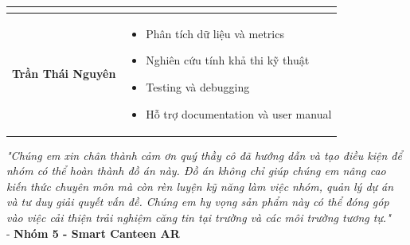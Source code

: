 \documentclass[12pt,a4paper]{article}
\begin{document}
\begin{table}[H]
\begin{tabular}{@{}>{\raggedright\arraybackslash}p{3.5cm}>{\raggedright\arraybackslash}p{11cm}@{}}
\begin{itemize}[leftmargin=0.3cm,topsep=0pt,itemsep=1pt]
\end{itemize} \\
\midrule
\textbf{Trần Thái Nguyên} & 
\begin{itemize}[leftmargin=0.3cm,topsep=0pt,itemsep=1pt]
    \item Phân tích dữ liệu và metrics
    \item Nghiên cứu tính khả thi kỹ thuật
    \item Testing và debugging
    \item Hỗ trợ documentation và user manual
\end{itemize} \\
\bottomrule
\end{tabular}
\end{table}

\begin{tcolorbox}[colback=orange!5!white,colframe=orange,title=\textbf{Lời cảm ơn}]
\textit{"Chúng em xin chân thành cảm ơn quý thầy cô đã hướng dẫn và tạo điều kiện để nhóm có thể hoàn thành đồ án này. Đồ án không chỉ giúp chúng em nâng cao kiến thức chuyên môn mà còn rèn luyện kỹ năng làm việc nhóm, quản lý dự án và tư duy giải quyết vấn đề. Chúng em hy vọng sản phẩm này có thể đóng góp vào việc cải thiện trải nghiệm căng tin tại trường và các môi trường tương tự."} \\

\hfill - \textbf{Nhóm 5 - Smart Canteen AR}
\end{tcolorbox}
\end{document}
